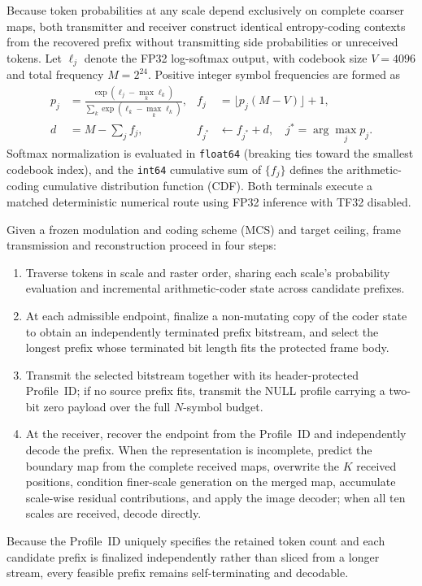 \documentclass[10pt,letterpaper]{article}
\begin{document}
Because token probabilities at any scale depend exclusively on complete coarser maps, both transmitter and receiver construct identical entropy-coding contexts from the recovered prefix without transmitting side probabilities or unreceived tokens. Let $\ell_j$ denote the FP32 log-softmax output, with codebook size $V=4096$ and total frequency $M=2^{24}$. Positive integer symbol frequencies are formed as
\begin{align}
p_j &= \frac{\exp(\ell_j - \max_k \ell_k)}{\sum_k \exp(\ell_k - \max_k \ell_k)}, &
f_j &= \lfloor p_j(M - V)\rfloor + 1, \label{eq:s1}\\
d &= M - \sum_j f_j, &
f_{j^*} &\leftarrow f_{j^*} + d, \quad j^* = \arg\max_j p_j. \label{eq:s2}
\end{align}
Softmax normalization is evaluated in \texttt{float64} (breaking ties toward the smallest codebook index), and the \texttt{int64} cumulative sum of $\{f_j\}$ defines the arithmetic-coding cumulative distribution function (CDF). Both terminals execute a matched deterministic numerical route using FP32 inference with TF32 disabled.

Given a frozen modulation and coding scheme (MCS) and target ceiling, frame transmission and reconstruction proceed in four steps:
\begin{enumerate}
  \item Traverse tokens in scale and raster order, sharing each scale's probability evaluation and incremental arithmetic-coder state across candidate prefixes.
  \item At each admissible endpoint, finalize a non-mutating copy of the coder state to obtain an independently terminated prefix bitstream, and select the longest prefix whose terminated bit length fits the protected frame body.
  \item Transmit the selected bitstream together with its header-protected Profile~ID; if no source prefix fits, transmit the NULL profile carrying a two-bit zero payload over the full $N$-symbol budget.
  \item At the receiver, recover the endpoint from the Profile~ID and independently decode the prefix. When the representation is incomplete, predict the boundary map from the complete received maps, overwrite the $K$ received positions, condition finer-scale generation on the merged map, accumulate scale-wise residual contributions, and apply the image decoder; when all ten scales are received, decode directly.
\end{enumerate}
Because the Profile~ID uniquely specifies the retained token count and each candidate prefix is finalized independently rather than sliced from a longer stream, every feasible prefix remains self-terminating and decodable.
\end{document}
